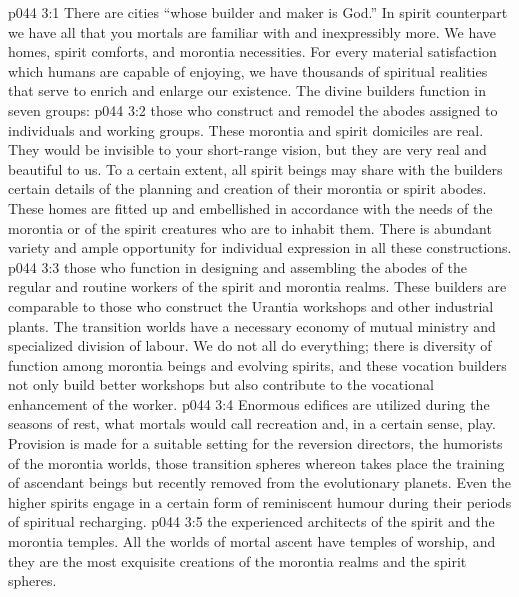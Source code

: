 \vs p044 3:1 There are cities “whose builder and maker is God.” In spirit counterpart we have all that you mortals are familiar with and inexpressibly more. We have homes, spirit comforts, and morontia necessities. For every material satisfaction which humans are capable of enjoying, we have thousands of spiritual realities that serve to enrich and enlarge our existence. The divine builders function in seven groups:
\vs p044 3:2 \bibnobreakspace {} those who construct and remodel the abodes assigned to individuals and working groups. These morontia and spirit domiciles are real. They would be invisible to your short\hyp{}range vision, but they are very real and beautiful to us. To a certain extent, all spirit beings may share with the builders certain details of the planning and creation of their morontia or spirit abodes. These homes are fitted up and embellished in accordance with the needs of the morontia or of the spirit creatures who are to inhabit them. There is abundant variety and ample opportunity for individual expression in all these constructions.
\vs p044 3:3 \bibnobreakspace {} those who function in designing and assembling the abodes of the regular and routine workers of the spirit and morontia realms. These builders are comparable to those who construct the Urantia workshops and other industrial plants. The transition worlds have a necessary economy of mutual ministry and specialized division of labour. We do not all do everything; there is diversity of function among morontia beings and evolving spirits, and these vocation builders not only build better workshops but also contribute to the vocational enhancement of the worker.
\vs p044 3:4 \bibnobreakspace {} Enormous edifices are utilized during the seasons of rest, what mortals would call recreation and, in a certain sense, play. Provision is made for a suitable setting for the reversion directors, the humorists of the morontia worlds, those transition spheres whereon takes place the training of ascendant beings but recently removed from the evolutionary planets. Even the higher spirits engage in a certain form of reminiscent humour during their periods of spiritual recharging.
\vs p044 3:5 \bibnobreakspace {} the experienced architects of the spirit and the morontia temples. All the worlds of mortal ascent have temples of worship, and they are the most exquisite creations of the morontia realms and the spirit spheres.
